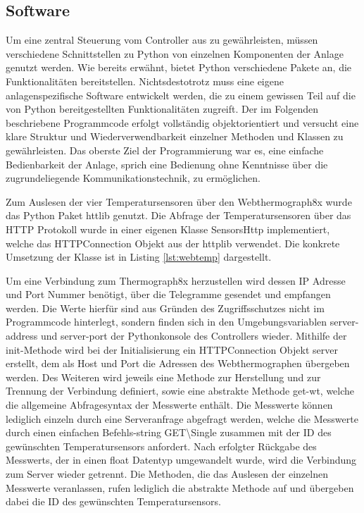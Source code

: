 \subsection{Software}

Um eine zentral Steuerung vom Controller aus zu gewährleisten, müssen verschiedene Schnittstellen zu Python von einzelnen Komponenten der Anlage genutzt werden.
Wie bereits erwähnt, bietet Python verschiedene Pakete an, die Funktionalitäten bereitstellen. Nichtsdestotrotz muss eine eigene anlagenspezifische Software entwickelt werden, die zu einem gewissen Teil auf die von Python bereitgestellten Funktionalitäten zugreift. Der im Folgenden beschriebene Programmcode erfolgt vollständig objektorientiert und versucht eine klare Struktur und Wiederverwendbarkeit einzelner Methoden und Klassen zu gewährleisten. Das oberste Ziel der Programmierung war es, eine einfache Bedienbarkeit der Anlage, sprich eine Bedienung ohne Kenntnisse über die zugrundeliegende Kommunikationstechnik, zu ermöglichen.

Zum Auslesen der vier Temperatursensoren über den Webthermograph8x wurde das Python Paket httlib genutzt. Die Abfrage der Temperatursensoren über das HTTP Protokoll wurde in einer eigenen Klasse SensorsHttp implementiert, welche das HTTPConnection Objekt aus der httplib verwendet. Die konkrete Umsetzung der Klasse ist in Listing \ref{lst:webtemp} dargestellt.

Um eine Verbindung zum Thermograph8x herzustellen wird dessen IP Adresse und Port Nummer benötigt, über die Telegramme gesendet und empfangen werden. Die Werte hierfür sind aus Gründen des Zugriffsschutzes nicht im Programmcode hinterlegt, sondern finden sich in den Umgebungsvariablen server-address und server-port der Pythonkonsole des Controllers wieder.
Mithilfe der init-Methode wird bei der Initialisierung ein HTTPConnection Objekt server erstellt, dem als Host und Port die Adressen des Webthermographen übergeben werden.
Des Weiteren wird jeweils eine Methode zur Herstellung und zur Trennung der Verbindung definiert, sowie eine abstrakte Methode get-wt, welche die allgemeine Abfragesyntax der Messwerte enthält. Die Messwerte können lediglich einzeln durch eine Serveranfrage abgefragt werden, welche die Messwerte durch einen einfachen Befehls-string \Gun GET\textbackslash Single \Gob zusammen mit der ID des gewünschten Temperatursensors anfordert. Nach erfolgter Rückgabe des Messwerts, der in einen float Datentyp umgewandelt wurde, wird die Verbindung zum Server wieder getrennt. Die Methoden, die das Auslesen der einzelnen Messwerte veranlassen, rufen lediglich die abstrakte Methode auf und übergeben dabei die ID des gewünschten Temperatursensors.

